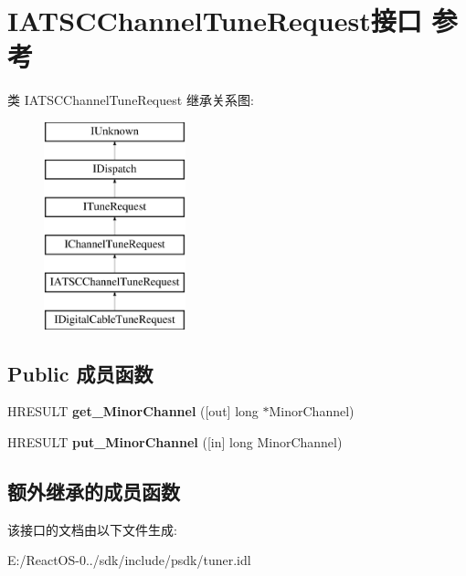 \hypertarget{interface_i_a_t_s_c_channel_tune_request}{}\section{I\+A\+T\+S\+C\+Channel\+Tune\+Request接口 参考}
\label{interface_i_a_t_s_c_channel_tune_request}
类 I\+A\+T\+S\+C\+Channel\+Tune\+Request 继承关系图\+:\begin{figure}[H]
\begin{center}
\leavevmode
\includegraphics[height=6.000000cm]{interface_i_a_t_s_c_channel_tune_request}
\end{center}
\end{figure}
\subsection*{Public 成员函数}
\begin{DoxyCompactItemize}
\item 
\mbox{\label{interface_i_a_t_s_c_channel_tune_request_a0844ca553c8e256b908a78f1bf25b737}} 
H\+R\+E\+S\+U\+LT {\bfseries get\+\_\+\+Minor\+Channel} (\mbox{[}out\mbox{]} long $\ast$Minor\+Channel)
\item 
\mbox{\label{interface_i_a_t_s_c_channel_tune_request_ae642a5c1613f49f0f06e63a3a27adef4}} 
H\+R\+E\+S\+U\+LT {\bfseries put\+\_\+\+Minor\+Channel} (\mbox{[}in\mbox{]} long Minor\+Channel)
\end{DoxyCompactItemize}
\subsection*{额外继承的成员函数}


该接口的文档由以下文件生成\+:\begin{DoxyCompactItemize}
\item 
E\+:/\+React\+O\+S-\/0../sdk/include/psdk/tuner.\+idl\end{DoxyCompactItemize}
